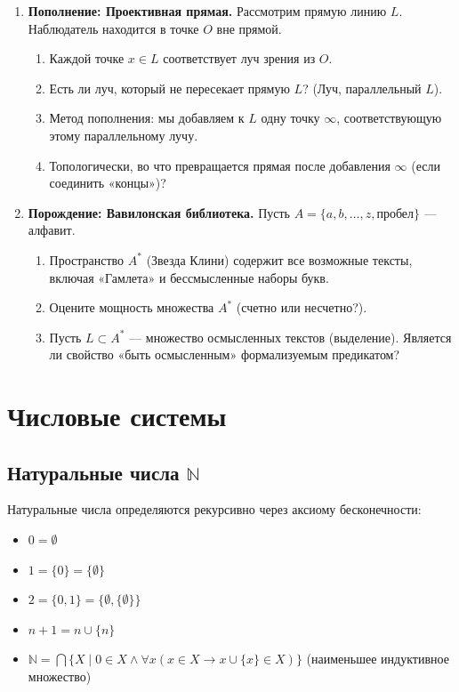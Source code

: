 \documentclass[11pt, a4paper]{extarticle}
\newcommand{\N}{{\mathbb N}}
\begin{document}
\begin{exercise}
\begin{enumerate}
        \item \textbf{Пополнение: Проективная прямая.}
        Рассмотрим прямую линию $L$. Наблюдатель находится в точке $O$ вне прямой.
        \begin{enumerate}
            \item Каждой точке $x \in L$ соответствует луч зрения из $O$.
            \item Есть ли луч, который не пересекает прямую $L$? (Луч, параллельный $L$).
            \item Метод пополнения: мы добавляем к $L$ одну точку $\infty$, соответствующую этому параллельному лучу.
            \item Топологически, во что превращается прямая после добавления $\infty$ (если соединить «концы»)?
        \end{enumerate}
        
        \item \textbf{Порождение: Вавилонская библиотека.}
        Пусть $A = \{a, b, \dots, z, \text{пробел}\}$ — алфавит.
        \begin{enumerate}
            \item Пространство $A^*$ (Звезда Клини) содержит все возможные тексты, включая «Гамлета» и бессмысленные наборы букв.
            \item Оцените мощность множества $A^*$ (счетно или несчетно?).
            \item Пусть $L \subset A^*$ — множество осмысленных текстов (выделение). Является ли свойство «быть осмысленным» формализуемым предикатом?
        \end{enumerate}
    \end{enumerate}
    \end{exercise}




\newpage
\section{Числовые системы}

\subsection{Натуральные числа $\N$}

\begin{definition}
Натуральные числа определяются рекурсивно через аксиому бесконечности:
\begin{itemize}
    \item $0 = \emptyset$
    \item $1 = \{0\} = \{\emptyset\}$
    \item $2 = \{0, 1\} = \{\emptyset, \{\emptyset\}\}$
    \item $n + 1 = n \cup \{n\}$
    \item $\N = \bigcap \{X \mid 0 \in X \land \forall x (x \in X \to x \cup \{x\} \in X)\}$ (наименьшее индуктивное множество)
\end{itemize}
\end{definition}
\end{document}
